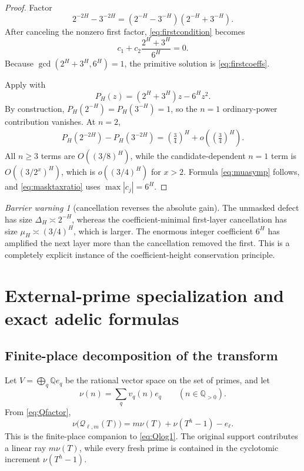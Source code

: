 \documentclass[11pt]{article}
\numberwithin{equation}{section}
\theoremstyle{definition}
\theoremstyle{remark}
\newtheorem{warning}[theorem]{Barrier warning}
\newcommand{\Q}{\mathbb Q}
\begin{document}
\begin{proof}
Factor
\[
  2^{-2H}-3^{-2H}
  =(2^{-H}-3^{-H})(2^{-H}+3^{-H}).
\]
After canceling the nonzero first factor, \eqref{eq:firstcondition} becomes
\[
  c_1+c_2\frac{2^H+3^H}{6^H}=0.
\]
Because $\gcd(2^H+3^H,6^H)=1$, the primitive solution is \eqref{eq:firstcoeffs}.

Apply  with
\[
  P_H(z)=(2^H+3^H)z-6^Hz^2.
\]
By construction, $P_H(2^{-H})=P_H(3^{-H})=1$, so the $n=1$ ordinary-power contribution vanishes.  At $n=2$,
\begin{align*}
 P_H(2^{-2H})-P_H(3^{-2H})
  =\left(\frac34\right)^H+o\!\left(\left(\frac34\right)^H\right).
\end{align*}
All $n\ge3$ terms are $O((3/8)^H)$, while the candidate-dependent $n=1$ term is $O((3/2^x)^H)$, which is $o((3/4)^H)$ for $x>2$.  Formula \eqref{eq:muasymp} follows, and \eqref{eq:masktaxratio} uses $\max|c_j|=6^H$.
\end{proof}

\begin{warning}[cancellation reverses the absolute gain]
The unmasked defect has size $\Delta_H\asymp2^{-H}$, whereas the coefficient-minimal first-layer cancellation has size $\mu_H\asymp(3/4)^H$, which is larger.  The enormous integer coefficient $6^H$ has amplified the next layer more than the cancellation removed the first.  This is a completely explicit instance of the coefficient-height conservation principle.
\end{warning}

\section{External-prime specialization and exact adelic formulas}

\subsection{Finite-place decomposition of the transform}

Let $V=\bigoplus_q\Q e_q$ be the rational vector space on the set of primes, and let
\begin{equation}\label{eq:nu}
  \nu(n)=\sum_q v_q(n)e_q
  \qquad(n\in\Q_{>0}).
\end{equation}
From \eqref{eq:Qfactor},
\begin{equation}\label{eq:nuQ}
  \nu\bigl(\mathcal Q_{\ell,m}(T)\bigr)
  =m\nu(T)+\nu(T^h-1)-e_\ell.
\end{equation}
This is the finite-place companion to \eqref{eq:Qlog1}.  The original support contributes a linear ray $m\nu(T)$, while every fresh prime is contained in the cyclotomic increment $\nu(T^h-1)$.
\end{document}
